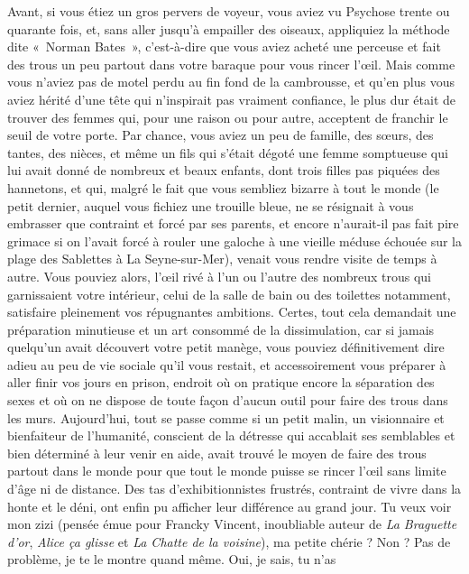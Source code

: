 Avant, si vous étiez un gros pervers de voyeur, vous aviez vu Psychose trente ou quarante fois, et, sans aller jusqu’à empailler des oiseaux, appliquiez la méthode dite «~Norman Bates~», c’est-à-dire que vous aviez acheté une perceuse et fait des trous un peu partout dans votre baraque pour vous rincer l’œil. Mais comme vous n’aviez pas de motel perdu au fin fond de la cambrousse, et qu’en plus vous aviez hérité d’une tête qui n’inspirait pas vraiment confiance, le plus dur était de trouver des femmes qui, pour une raison ou pour autre, acceptent de franchir le seuil de votre porte. Par chance, vous aviez un peu de famille, des sœurs, des tantes, des nièces, et même un fils qui s’était dégoté une femme somptueuse qui lui avait donné de nombreux et beaux enfants, dont trois filles pas piquées des hannetons, et qui, malgré le fait que vous sembliez bizarre à tout le monde (le petit dernier, auquel vous fichiez une trouille bleue, ne se résignait à vous embrasser que contraint et forcé par ses parents, et encore n’aurait-il pas fait pire grimace si on l’avait forcé à rouler une galoche à une vieille méduse échouée sur la plage des Sablettes à La Seyne-sur-Mer), venait vous rendre visite de temps à autre. Vous pouviez alors, l’œil rivé à l’un ou l’autre des nombreux trous qui garnissaient votre intérieur, celui de la salle de bain ou des toilettes notamment, satisfaire pleinement vos répugnantes ambitions. Certes, tout cela demandait une préparation minutieuse et un art consommé de la dissimulation, car si jamais quelqu’un avait découvert votre petit manège, vous pouviez définitivement dire adieu au peu de vie sociale qu’il vous restait, et accessoirement vous préparer à aller finir vos jours en prison, endroit où on pratique encore la séparation des sexes et où on ne dispose de toute façon d’aucun outil pour faire des trous dans les murs. Aujourd’hui, tout se passe comme si un petit malin, un visionnaire et bienfaiteur de l’humanité, conscient de la détresse qui accablait ses semblables et bien déterminé à leur venir en aide, avait trouvé le moyen de faire des trous partout dans le monde pour que tout le monde puisse se rincer l’œil sans limite d’âge ni de distance. Des tas d’exhibitionnistes frustrés, contraint de vivre dans la honte et le déni, ont enfin pu afficher leur différence au grand jour. Tu veux voir mon zizi (pensée émue pour Francky Vincent, inoubliable auteur de \textit{La Braguette d’or}, \textit{Alice ça glisse} et \textit{La Chatte de la voisine}), ma petite chérie ? Non ? Pas de problème, je te le montre quand même. Oui, je sais, tu n’as 